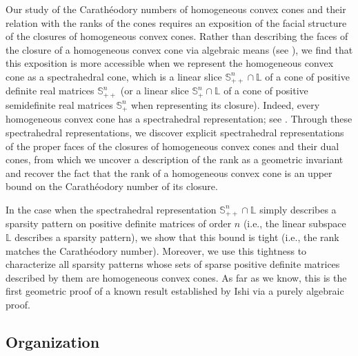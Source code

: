 \documentclass[oneside]{amsart}
\theoremstyle{plain}
\theoremstyle{definition}
\theoremstyle{remark}
\numberwithin{equation}{section}
\begin{document}
Our study of the Carath\'eodory numbers of homogeneous convex cones and
their relation with the ranks of the cones requires an exposition of the
facial structure of the closures of homogeneous convex cones. Rather than
describing the faces of the closure of a homogeneous convex cone via
algebraic means (see \cite[\S4]{Chua06}), we find that this exposition is
more accessible when we represent the homogeneous convex cone as a
spectrahedral cone, which is a linear slice $\mathbb{S}^{n}_{++} \cap
\mathbb{L}$ of a cone of positive definite real matrices
$\mathbb{S}^{n}_{++}$ (or a linear slice $\mathbb{S}^{n}_{+} \cap
\mathbb{L}$ of a cone of positive semidefinite real matrices
$\mathbb{S}^{n}_{+}$ when representing its closure). Indeed, every
homogeneous convex cone has a spectrahedral representation; see
\cite{Chua02,Ishi15,Rot66}. Through these spectrahedral representations, we
discover explicit spectrahedral representations of the proper faces of the
closures of homogeneous convex cones and their dual cones, from which we
uncover a description of the rank as a geometric invariant and recover the
fact that the rank of a homogeneous convex cone is an upper bound on the
Carath\'eodory number of its closure.

In the case when the spectrahedral representation $\mathbb{S}^{n}_{++} \cap
\mathbb{L}$ simply describes a sparsity pattern on positive definite
matrices of order $n$ (i.e., the linear subspace $\mathbb{L}$ describes a
sparsity pattern), we show that this bound is tight (i.e., the rank matches
the Carath\'eodory number). Moreover, we use this tightness to characterize
all sparsity patterns whose sets of sparse positive definite matrices
described by them are homogeneous convex cones. As far as we know, this is
the first geometric proof of a known result established by Ishi
\cite{Ishi13} via a purely algebraic proof.

\subsection{Organization}
\label{section:organization}
\end{document}
